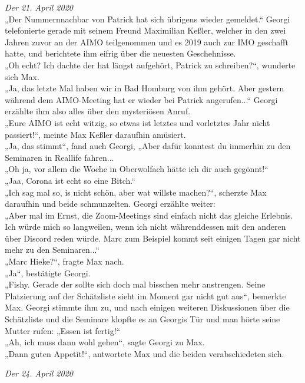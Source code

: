 \documentclass[oneside]{memoir}
\begin{document}
\textit{Der 21. April 2020} \\ 
„Der Nummernnachbar von Patrick hat sich übrigens wieder gemeldet.“ Georgi telefonierte gerade mit seinem Freund Maximilian Keßler, welcher in den zwei Jahren zuvor an der AIMO teilgenommen und es 2019 auch zur IMO geschafft hatte, und berichtete ihm eifrig über die neuesten Geschehnisse. \\
 „Oh echt? Ich dachte der hat längst aufgehört, Patrick zu schreiben?“, wunderte sich Max. \\
 „Ja, das letzte Mal haben wir in Bad Homburg von ihm gehört. Aber gestern während dem AIMO-Meeting hat er wieder bei Patrick angerufen...“ Georgi erzählte ihm also alles über den mysteriösen Anruf. \\
 „Eure AIMO ist echt witzig, so etwas ist letztes und vorletztes Jahr nicht passiert!“, meinte Max Keßler daraufhin amüsiert. \\
 „Ja, das stimmt“, fand auch Georgi, „Aber dafür konntest du immerhin zu den Seminaren in Reallife fahren... \\
  „Oh ja, vor allem die Woche in Oberwolfach hätte ich dir auch gegönnt!“ \\
   „Jaa, Corona ist echt so eine Bitch.“ \\
    „Ich sag mal so, is nicht schön, aber wat willste machen?“, scherzte Max daraufhin und beide schmunzelten. Georgi erzählte weiter: \\
    „Aber mal im Ernst, die Zoom-Meetings sind einfach nicht das gleiche Erlebnis. Ich würde mich so langweilen, wenn ich nicht währenddessen mit den anderen über Discord reden würde. Marc zum Beispiel kommt seit einigen Tagen gar nicht mehr zu den Seminaren...“ \\
    „Marc Hieke?“, fragte Max nach. \\
     „Ja“, bestätigte Georgi. \\
     „Fishy. Gerade der sollte sich doch mal bisschen mehr anstrengen. Seine Platzierung auf der Schätzliste sieht im Moment gar nicht gut aus“, bemerkte Max. Georgi stimmte ihm zu, und nach einigen weiteren Diskussionen über die Schätzliste und die Seminare klopfte es an Georgis Tür und man hörte seine Mutter rufen: „Essen ist fertig!“ \\
     „Ah, ich muss dann wohl gehen“, sagte Georgi zu Max. \\
     „Dann guten Appetit!“, antwortete Max und die beiden verabschiedeten sich.
     
     \bigskip \bigskip \bigskip \bigskip
     \textit{Der 24. April 2020} \\ 
     
\end{document}
